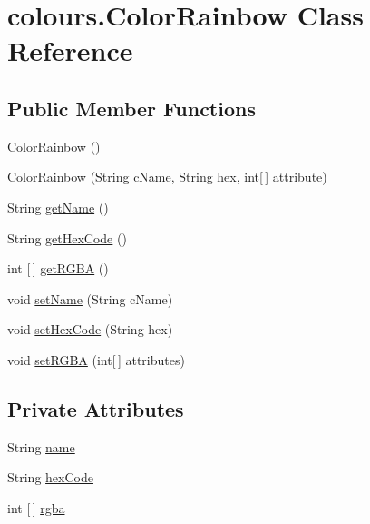 \hypertarget{classcolours_1_1_color_rainbow}{}\section{colours.\+Color\+Rainbow Class Reference}
\label{classcolours_1_1_color_rainbow}
\subsection*{Public Member Functions}
\begin{DoxyCompactItemize}
\item 
\hyperlink{classcolours_1_1_color_rainbow_a5b5afcd7b84d4ce9d9114e83952c0667}{Color\+Rainbow} ()
\item 
\hyperlink{classcolours_1_1_color_rainbow_ae530ee141556838d725f6a234d7673e2}{Color\+Rainbow} (String c\+Name, String hex, int\mbox{[}$\,$\mbox{]} attribute)
\item 
String \hyperlink{classcolours_1_1_color_rainbow_a57cfc0abf128e97ed4f73838ba53f3d2}{get\+Name} ()
\item 
String \hyperlink{classcolours_1_1_color_rainbow_a0ef212a2389b9b5e3d3e079910ef13ad}{get\+Hex\+Code} ()
\item 
int \mbox{[}$\,$\mbox{]} \hyperlink{classcolours_1_1_color_rainbow_a5db769528ebfc07663a3581cdd547aae}{get\+R\+G\+BA} ()
\item 
void \hyperlink{classcolours_1_1_color_rainbow_a85293b45ccd52f616154c816284ef58d}{set\+Name} (String c\+Name)
\item 
void \hyperlink{classcolours_1_1_color_rainbow_aaf06ae34e7cffbf90e25de191b815527}{set\+Hex\+Code} (String hex)
\item 
void \hyperlink{classcolours_1_1_color_rainbow_a68e01c5237778bf54cba5990def3851a}{set\+R\+G\+BA} (int\mbox{[}$\,$\mbox{]} attributes)
\end{DoxyCompactItemize}
\subsection*{Private Attributes}
\begin{DoxyCompactItemize}
\item 
String \hyperlink{classcolours_1_1_color_rainbow_a829067e626095a0cb25ef7f708ddccb3}{name}
\item 
String \hyperlink{classcolours_1_1_color_rainbow_ae74af795ded4a45f8bffdc26f971903a}{hex\+Code}
\item 
int \mbox{[}$\,$\mbox{]} \hyperlink{classcolours_1_1_color_rainbow_aea1f40a66bcc34656e109edcc9cf86dd}{rgba}
\end{DoxyCompactItemize}


